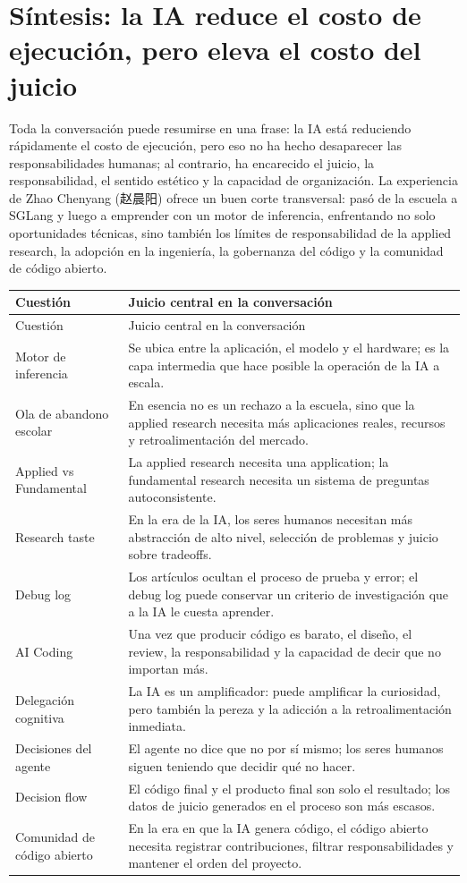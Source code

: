 \section{Síntesis: la IA reduce el costo de ejecución, pero eleva el costo del juicio}

Toda la conversación puede resumirse en una frase: la IA está reduciendo rápidamente el costo de ejecución, pero eso no ha hecho desaparecer las responsabilidades humanas; al contrario, ha encarecido el juicio, la responsabilidad, el sentido estético y la capacidad de organización. La experiencia de Zhao Chenyang (赵晨阳) ofrece un buen corte transversal: pasó de la escuela a SGLang y luego a emprender con un motor de inferencia, enfrentando no solo oportunidades técnicas, sino también los límites de responsabilidad de la applied research, la adopción en la ingeniería, la gobernanza del código y la comunidad de código abierto.

\begin{longtable}{>{\raggedright\arraybackslash}p{} >{\raggedright\arraybackslash}p{}}
\toprule
Cuestión & Juicio central en la conversación \\
\midrule
\endfirsthead
\toprule
Cuestión & Juicio central en la conversación \\
\midrule
\endhead
Motor de inferencia & Se ubica entre la aplicación, el modelo y el hardware; es la capa intermedia que hace posible la operación de la IA a escala. \\
Ola de abandono escolar & En esencia no es un rechazo a la escuela, sino que la applied research necesita más aplicaciones reales, recursos y retroalimentación del mercado. \\
Applied vs Fundamental & La applied research necesita una application; la fundamental research necesita un sistema de preguntas autoconsistente. \\
Research taste & En la era de la IA, los seres humanos necesitan más abstracción de alto nivel, selección de problemas y juicio sobre tradeoffs. \\
Debug log & Los artículos ocultan el proceso de prueba y error; el debug log puede conservar un criterio de investigación que a la IA le cuesta aprender. \\
AI Coding & Una vez que producir código es barato, el diseño, el review, la responsabilidad y la capacidad de decir que no importan más. \\
Delegación cognitiva & La IA es un amplificador: puede amplificar la curiosidad, pero también la pereza y la adicción a la retroalimentación inmediata. \\
Decisiones del agente & El agente no dice que no por sí mismo; los seres humanos siguen teniendo que decidir qué no hacer. \\
Decision flow & El código final y el producto final son solo el resultado; los datos de juicio generados en el proceso son más escasos. \\
Comunidad de código abierto & En la era en que la IA genera código, el código abierto necesita registrar contribuciones, filtrar responsabilidades y mantener el orden del proyecto. \\
\bottomrule
\end{longtable}

